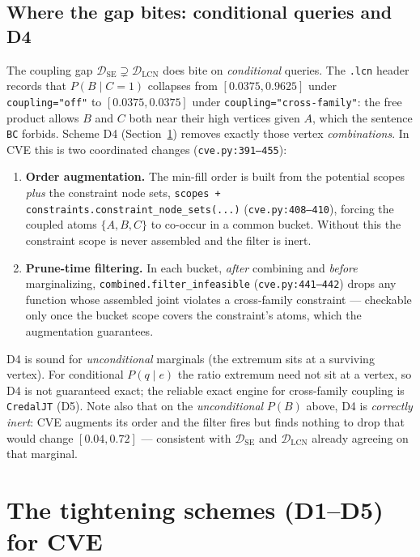 \documentclass[11pt]{article}
\newcommand{\DSE}{\mathcal{D}_{\mathrm{SE}}}
\newcommand{\DLCN}{\mathcal{D}_{\mathrm{LCN}}}
\begin{document}
\subsection{Where the gap bites: conditional queries and D4}
The coupling gap $\DSE\supsetneq\DLCN$ does bite on \emph{conditional} queries. The \texttt{.lcn}
header records that $P(B\mid C=1)$ collapses from $[0.0375,0.9625]$ under \texttt{coupling="off"} to
$[0.0375,0.0375]$ under \texttt{coupling="cross-family"}: the free product allows $B$ and $C$ both
near their high vertices given $A$, which the sentence \texttt{BC} forbids. Scheme D4
(Section~\ref{sec:schemes}) removes exactly those vertex \emph{combinations}. In CVE this is two
coordinated changes (\texttt{cve.py:391--455}):
\begin{enumerate}
  \item \textbf{Order augmentation.} The min-fill order is built from the potential scopes
    \emph{plus} the constraint node sets, \texttt{scopes + constraints.constraint\_node\_sets(...)}
    (\texttt{cve.py:408--410}), forcing the coupled atoms $\{A,B,C\}$ to co-occur in a common bucket.
    Without this the constraint scope is never assembled and the filter is inert.
  \item \textbf{Prune-time filtering.} In each bucket, \emph{after} combining and \emph{before}
    marginalizing, \texttt{combined.filter\_infeasible}
    (\texttt{cve.py:441--442}) drops any function whose assembled joint violates a cross-family
    constraint --- checkable only once the bucket scope covers the constraint's atoms, which the
    augmentation guarantees.
\end{enumerate}
D4 is sound for \emph{unconditional} marginals (the extremum sits at a surviving vertex). For
conditional $P(q\mid e)$ the ratio extremum need not sit at a vertex, so D4 is not guaranteed exact;
the reliable exact engine for cross-family coupling is \texttt{CredalJT} (D5). Note also that on the
\emph{unconditional} $P(B)$ above, D4 is \emph{correctly inert}: CVE augments its order and the
filter fires but finds nothing to drop that would change $[0.04,0.72]$ --- consistent with $\DSE$ and
$\DLCN$ already agreeing on that marginal.

\section{The tightening schemes (D1--D5) for CVE}\label{sec:schemes}
\end{document}
